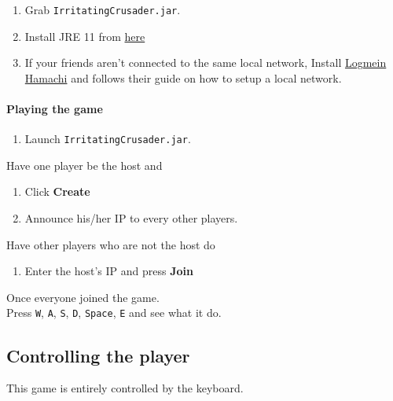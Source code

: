 \documentclass{article}
\providecommand{\tightlist}{%
	\setlength{\itemsep}{0pt}\setlength{\parskip}{0pt}}
\begin{document}
\begin{enumerate}
\def\labelenumi{\arabic{enumi}.}
\tightlist
\item
  Grab \texttt{IrritatingCrusader.jar}.
\item
  Install JRE 11 from
  \href{https://www.oracle.com/java/technologies/javase/jdk11-archive-downloads.html}{here}
\item
  If your friends aren't connected to the same local network, Install
  \href{https://www.vpn.net/}{Logmein Hamachi} and follows their guide
  on how to setup a local network.
\end{enumerate}

\hypertarget{playing-the-game}{%
\paragraph{Playing the game}\label{playing-the-game}}

\begin{enumerate}
\def\labelenumi{\arabic{enumi}.}
\tightlist
\item
  Launch \texttt{IrritatingCrusader.jar}.
\end{enumerate}

Have one player be the host and

\begin{enumerate}
\def\labelenumi{\arabic{enumi}.}
\tightlist
\item
  Click \textbf{Create}
\item
  Announce his/her IP to every other players.
\end{enumerate}

Have other players who are not the host do

\begin{enumerate}
\def\labelenumi{\arabic{enumi}.}
\tightlist
\item
  Enter the host's IP and press \textbf{Join}
\end{enumerate}

Once everyone joined the game.\\
Press \texttt{W}, \texttt{A}, \texttt{S}, \texttt{D}, \texttt{Space},
\texttt{E} and see what it do.

\hypertarget{controlling-the-player}{%
\subsection{Controlling the player}\label{controlling-the-player}}

This game is entirely controlled by the keyboard.
\end{document}
